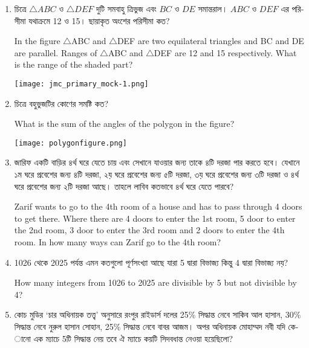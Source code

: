 \documentclass{article}
\begin{document}
\begin{enumerate}[label=\textbf{\arabic*.}]
	
	\item
		\begin{bengali}
			 চিত্রে $\triangle$$ABC$ ও $\triangle$$DEF$ দুটি সমবাহু ত্রিভুজ এবং $BC$ ও $DE$ সমান্তরাল। $ABC$ ও $DEF$ এর পরিসীমা যথাক্রমে  12 ও 15। ছায়াকৃত অংশের পরিসীমা কত?
		\end{bengali}
		
		In the figure $\triangle$ABC and $\triangle$DEF are two equilateral triangles and BC and DE are parallel. Ranges of $\triangle$ABC and $\triangle$DEF are 12 and 15 respectively. What is the range of the shaded part?
	\begin{center}
		\texttt{[image: jmc\_primary\_mock-1.png]}
	\end{center}

	\item 
	\begin{bengali}
		চিত্রে বহুভুজটির কোণের সমষ্টি কত?
	\end{bengali}
	
	What is the sum of the angles of the polygon in the figure?
	
	\begin{center}
		\texttt{[image: polygonfigure.png]}
	\end{center}
    \item 
\begin{bengali}
	 জারিফ একটি বাড়ির ৪র্থ ঘরে যেতে চায় এবং সেখানে যাওয়ার জন্য তাকে ৪টি দরজা পার করতে হবে। যেখানে ১ম ঘরে প্রবেশের জন্য ৪টি দরজা, ২য় ঘরে প্রবেশের জন্য ৫টি দরজা, ৩য় ঘরে প্রবেশের জন্য ৩টি দরজা ও ৪র্থ ঘরে প্রবেশের জন্য ২টি দরজা আছে। তাহলে লাবিব কতভাবে ৪র্থ ঘরে যেতে পারবে?
\end{bengali}

Zarif wants to go to the 4th room of a house and has to pass through 4 doors to get there. Where there are 4 doors to enter the 1st room, 5 door to enter the 2nd room, 3 door to enter the 3rd room and 2 doors to enter the 4th room. In how many ways can Zarif go to the 4th room?

\item 
\begin{bengali}
	 1026 থেকে 2025 পর্যন্ত  এমন কতগুলো পূর্ণসংখ্যা আছে যারা 5 দ্বারা বিভাজ্য কিন্তু 4 দ্বারা বিভাজ্য নয়?
\end{bengali}

How many integers from 1026 to 2025 are divisible by 5 but not divisible by 4?

\item 
\begin{bengali}
	 কোচ মুডির ‘চার অধিনায়ক তত্ত্ব’ অনুসারে রংপুর রাইডার্স দলের 25\% সিদ্ধান্ত নেবে সাকিব আল হাসান, 30\% সিদ্ধান্ত নেবে নুরুল হাসান সোহান, 25\% সিদ্ধান্ত নেবে বাবর আজম। অপর অধিনায়ক মোহাম্মদ নবী যদি কোনো এক ম্যাচে 5টি সিদ্ধান্ত নেয় তবে ঐ ম্যাচে কয়টি সিদবধান্ত নেওয়া হয়েছিলো? 
\end{bengali}


\end{enumerate}
\end{document}
